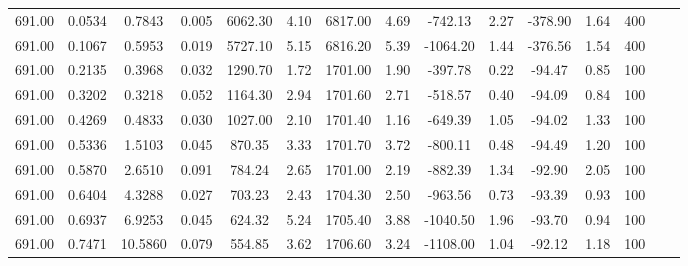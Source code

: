 \documentclass[%
 aip,
 jcp,
 sd,%
 amsmath,amssymb,
]{revtex4-1}
\begin{document}
\begin{table}[!htbp]
\begin{ruledtabular}
\begin{tabular}{ccccccccccccccc}
691.00 & 0.0534 & 0.7843  & 0.005 & 6062.30 & 4.10 & 6817.00 & 4.69 & -742.13  & 2.27 & -378.90 & 1.64 & 400 \\
691.00 & 0.1067 & 0.5953  & 0.019 & 5727.10 & 5.15 & 6816.20 & 5.39 & -1064.20 & 1.44 & -376.56 & 1.54 & 400 \\
691.00 & 0.2135 & 0.3968  & 0.032 & 1290.70 & 1.72 & 1701.00 & 1.90 & -397.78  & 0.22 & -94.47  & 0.85 & 100 \\
691.00 & 0.3202 & 0.3218  & 0.052 & 1164.30 & 2.94 & 1701.60 & 2.71 & -518.57  & 0.40 & -94.09  & 0.84 & 100 \\
691.00 & 0.4269 & 0.4833  & 0.030 & 1027.00 & 2.10 & 1701.40 & 1.16 & -649.39  & 1.05 & -94.02  & 1.33 & 100 \\
691.00 & 0.5336 & 1.5103  & 0.045 & 870.35  & 3.33 & 1701.70 & 3.72 & -800.11  & 0.48 & -94.49  & 1.20 & 100 \\
691.00 & 0.5870 & 2.6510  & 0.091 & 784.24  & 2.65 & 1701.00 & 2.19 & -882.39  & 1.34 & -92.90  & 2.05 & 100 \\
691.00 & 0.6404 & 4.3288  & 0.027 & 703.23  & 2.43 & 1704.30 & 2.50 & -963.56  & 0.73 & -93.39  & 0.93 & 100 \\
691.00 & 0.6937 & 6.9253  & 0.045 & 624.32  & 5.24 & 1705.40 & 3.88 & -1040.50 & 1.96 & -93.70  & 0.94 & 100 \\
691.00 & 0.7471 & 10.5860 & 0.079 & 554.85  & 3.62 & 1706.60 & 3.24 & -1108.00 & 1.04 & -92.12  & 1.18 & 100

\end{tabular}
\end{ruledtabular}
\end{table}
\end{document}
